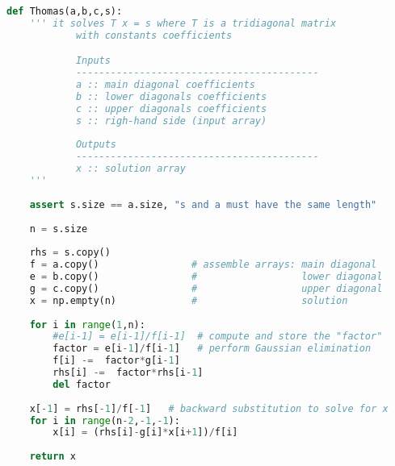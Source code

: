 \documentclass[11pt]{article}
\begin{document}
\begin{lstlisting}[language=python]
def Thomas(a,b,c,s):
    ''' it solves T x = s where T is a tridiagonal matrix
            with constants coefficients

            Inputs
            ------------------------------------------
            a :: main diagonal coefficients
            b :: lower diagonals coefficients
            c :: upper diagonals coefficients
            s :: righ-hand side (input array)
            
            Outputs
            ------------------------------------------
            x :: solution array
    '''
    
    assert s.size == a.size, "s and a must have the same length"
    
    n = s.size
    
    rhs = s.copy()
    f = a.copy()                # assemble arrays: main diagonal
    e = b.copy()                #                  lower diagonal
    g = c.copy()                #                  upper diagonal
    x = np.empty(n)             #                  solution
                        
    for i in range(1,n):
        #e[i-1] = e[i-1]/f[i-1]  # compute and store the "factor"
        factor = e[i-1]/f[i-1]   # perform Gaussian elimination
        f[i] -=  factor*g[i-1]
        rhs[i] -=  factor*rhs[i-1]
        del factor
    
    x[-1] = rhs[-1]/f[-1]   # backward substitution to solve for x
    for i in range(n-2,-1,-1):
        x[i] = (rhs[i]-g[i]*x[i+1])/f[i]
        
    return x
\end{lstlisting}
\end{document}

